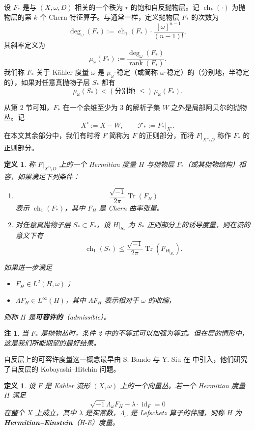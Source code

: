 \documentclass[12pt,a4paper]{article}
\newtheorem{definition}[theorem]{定义}
\newtheorem{remark}[theorem]{注}
\newcommand{\ch}{\operatorname{ch}}
\newcommand{\rank}{\operatorname{rank}}
\newcommand{\Tr}{\operatorname{Tr}}
\newcommand{\Id}{\operatorname{id}}
\begin{document}
设 \(F_*\) 是与 \((X,\omega,D)\) 相关的一个秩为 \(r\) 的饱和自反抛物层。记 \(\ch_k(\cdot)\) 为抛物层的第 \(k\) 个 Chern 特征算子。与通常一样，定义抛物层 \(F_*\) 的次数为
\[
\deg_\omega(F_*):=\ch_1(F_*)\cdot \frac{[\omega]^{n-1}}{(n-1)!},
\]
其斜率定义为
\[
\mu_\omega(F_*):=\frac{\deg_\omega(F_*)}{\rank(F_*)}.
\]
我们称 \(F_*\) 关于 Kähler 度量 \(\omega\) 是 \(\mu_\omega\)-稳定（或简称 \(\omega\)-稳定）的（分别地，半稳定的），如果对任意真抛物子层 \(S_*\) 都有
\[
\mu_\omega(S_*)<(\text{分别地 } \le)\,\mu_\omega(F_*).
\]

从第 2 节可知，\(F_*\) 在一个余维至少为 3 的解析子集 \(W\) 之外是局部阿贝尔的抛物丛。记
\[
X^\circ:=X-W,\qquad \mathcal F_*:=F_*|_{X^\circ}.
\]
在本文其余部分中，我们有时将 \(F\) 简称为 \(F\) 的正则部分，而将 \(F|_{X^\circ\setminus D}\) 称作 \(F_*\) 的正则部分。

\begin{definition}
称 \(F|_{X^\circ\setminus D}\) 上的一个 Hermitian 度量 \(H\) 与抛物层 \(F_*\)（或其抛物结构）相容，如果满足下列条件：
\begin{enumerate}[label=\arabic*.]
\item
\[
\frac{\sqrt{-1}}{2\pi}\Tr(F_H)
\]
表示 \(\ch_1(F_*)\)，其中 \(F_H\) 是 Chern 曲率张量。
\item 对任意真抛物子层 \(S_*\subset F_*\)，设 \(H|_{S_*}\) 为 \(S_*\) 正则部分上的诱导度量，则在流的意义下有
\[
\ch_1(S_*)\le \frac{\sqrt{-1}}{2\pi}\Tr(F_{H|_{S_*}}).
\]
\end{enumerate}
如果进一步满足
\begin{itemize}
\item \(F_H\in L^2(H,\omega)\)；
\item \(\Lambda F_H\in L^\infty(H)\)，其中 \(\Lambda F_H\) 表示相对于 \(\omega\) 的收缩，
\end{itemize}
则称 \(H\) 是\textbf{可容许的}（admissible）。
\end{definition}

\begin{remark}
当 \(F_*\) 是抛物丛时，条件 2 中的不等式可以加强为等式。但在层的情形中，这是我们所能期望的最好结果。
\end{remark}

自反层上的可容许度量这一概念最早由 S. Bando 与 Y. Siu 在 \cite{BandoSiu} 中引入，他们研究了自反层的 Kobayashi--Hitchin 问题。

\begin{definition}
设 \(F\) 是 Kähler 流形 \((X,\omega)\) 上的一个向量丛。若一个 Hermitian 度量 \(H\) 满足
\[
\sqrt{-1}\Lambda_\omega F_H-\lambda\cdot \Id_F=0
\]
在整个 \(X\) 上成立，其中 \(\lambda\) 是实常数，\(\Lambda_\omega\) 是 Lefschetz 算子的伴随，则称 \(H\) 为 \textbf{Hermitian--Einstein}（H-E）度量。
\end{definition}
\end{document}
